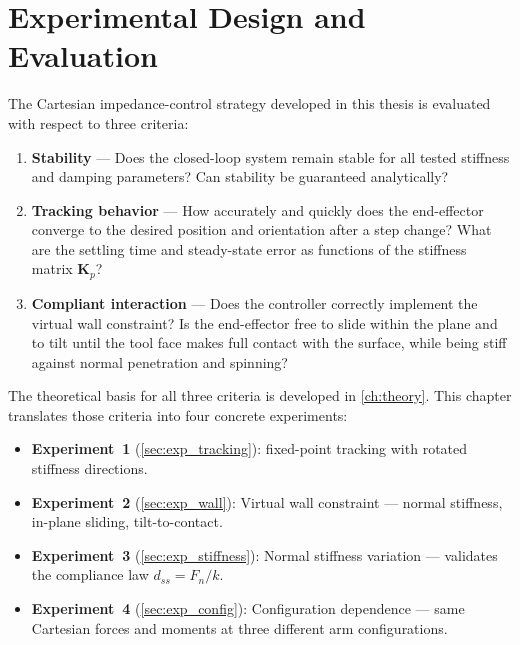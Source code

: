\chapter{Experimental Design and Evaluation}
\label{ch:archived_experiment_design}

The Cartesian impedance-control strategy developed in this thesis is
evaluated with respect to three criteria:

\begin{enumerate}
  \item \textbf{Stability} --- Does the closed-loop system remain stable
        for all tested stiffness and damping parameters?
        Can stability be guaranteed analytically?
  \item \textbf{Tracking behavior} --- How accurately and quickly does the
        end-effector converge to the desired position and orientation after a step change?
        What are the settling time and steady-state error as functions of
        the stiffness matrix $\mathbf{K}_p$?
  \item \textbf{Compliant interaction} --- Does the controller correctly
        implement the virtual wall constraint?
        Is the end-effector free to slide within the plane and to tilt
        until the tool face makes full contact with the surface,
        while being stiff against normal penetration and spinning?
\end{enumerate}

The theoretical basis for all three criteria is developed in
\cref{ch:theory}.
This chapter translates those criteria into four concrete experiments:

\begin{itemize}
  \item \textbf{Experiment~1} (\cref{sec:exp_tracking}): fixed-point tracking with rotated stiffness directions.
  \item \textbf{Experiment~2} (\cref{sec:exp_wall}): Virtual wall
        constraint --- normal stiffness, in-plane sliding, tilt-to-contact.
  \item \textbf{Experiment~3} (\cref{sec:exp_stiffness}): Normal stiffness
        variation --- validates the compliance law $d_{ss}=F_n/k$.
  \item \textbf{Experiment~4} (\cref{sec:exp_config}): Configuration
        dependence --- same Cartesian forces and moments at three different arm configurations.
\end{itemize}

